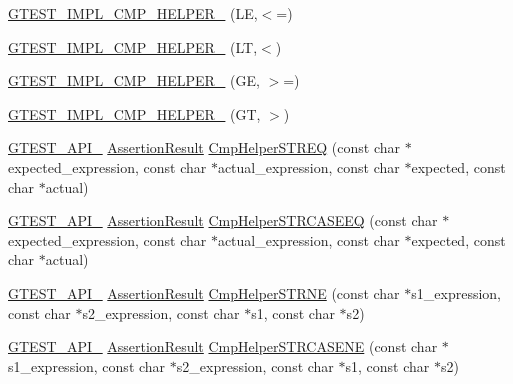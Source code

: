 \begin{DoxyCompactItemize}
\item 
\hyperlink{namespacetesting_1_1internal_ade60646b18728043fff84d7b4125de2c}{G\-T\-E\-S\-T\-\_\-\-I\-M\-P\-L\-\_\-\-C\-M\-P\-\_\-\-H\-E\-L\-P\-E\-R\-\_\-} (L\-E,$<$=)
\item 
\hyperlink{namespacetesting_1_1internal_aabcbff15eac496f8487699d19f42c274}{G\-T\-E\-S\-T\-\_\-\-I\-M\-P\-L\-\_\-\-C\-M\-P\-\_\-\-H\-E\-L\-P\-E\-R\-\_\-} (L\-T,$<$)
\item 
\hyperlink{namespacetesting_1_1internal_af969886067930ce70f6405cd5aa8b06b}{G\-T\-E\-S\-T\-\_\-\-I\-M\-P\-L\-\_\-\-C\-M\-P\-\_\-\-H\-E\-L\-P\-E\-R\-\_\-} (G\-E, $>$=)
\item 
\hyperlink{namespacetesting_1_1internal_a7fdb4fc164db83c51dfad17640bfeae9}{G\-T\-E\-S\-T\-\_\-\-I\-M\-P\-L\-\_\-\-C\-M\-P\-\_\-\-H\-E\-L\-P\-E\-R\-\_\-} (G\-T, $>$)
\item 
\hyperlink{ts__gtest_8h_aa73be6f0ba4a7456180a94904ce17790}{G\-T\-E\-S\-T\-\_\-\-A\-P\-I\-\_\-} \hyperlink{classtesting_1_1AssertionResult}{Assertion\-Result} \hyperlink{namespacetesting_1_1internal_a8621c45bf8d0c06ea0dda6f8cdbc2c6b}{Cmp\-Helper\-S\-T\-R\-E\-Q} (const char $\ast$expected\-\_\-expression, const char $\ast$actual\-\_\-expression, const char $\ast$expected, const char $\ast$actual)
\item 
\hyperlink{ts__gtest_8h_aa73be6f0ba4a7456180a94904ce17790}{G\-T\-E\-S\-T\-\_\-\-A\-P\-I\-\_\-} \hyperlink{classtesting_1_1AssertionResult}{Assertion\-Result} \hyperlink{namespacetesting_1_1internal_a911fceccafc659cf4b564c88634803bf}{Cmp\-Helper\-S\-T\-R\-C\-A\-S\-E\-E\-Q} (const char $\ast$expected\-\_\-expression, const char $\ast$actual\-\_\-expression, const char $\ast$expected, const char $\ast$actual)
\item 
\hyperlink{ts__gtest_8h_aa73be6f0ba4a7456180a94904ce17790}{G\-T\-E\-S\-T\-\_\-\-A\-P\-I\-\_\-} \hyperlink{classtesting_1_1AssertionResult}{Assertion\-Result} \hyperlink{namespacetesting_1_1internal_a6b485231a046ff760844a0321c04870b}{Cmp\-Helper\-S\-T\-R\-N\-E} (const char $\ast$s1\-\_\-expression, const char $\ast$s2\-\_\-expression, const char $\ast$s1, const char $\ast$s2)
\item 
\hyperlink{ts__gtest_8h_aa73be6f0ba4a7456180a94904ce17790}{G\-T\-E\-S\-T\-\_\-\-A\-P\-I\-\_\-} \hyperlink{classtesting_1_1AssertionResult}{Assertion\-Result} \hyperlink{namespacetesting_1_1internal_a5f74b933606b0a742cd5a8ad2d7087e0}{Cmp\-Helper\-S\-T\-R\-C\-A\-S\-E\-N\-E} (const char $\ast$s1\-\_\-expression, const char $\ast$s2\-\_\-expression, const char $\ast$s1, const char $\ast$s2)

\end{DoxyCompactItemize}
